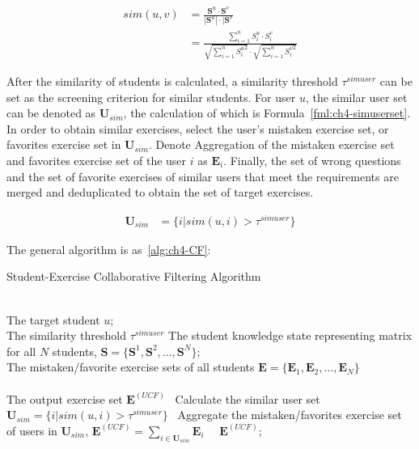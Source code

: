 \begin{equation}
  \begin{align}\label{fml:ch4-user_similarity}
    sim(u, v) & =\frac{\mathbf{S}^u \cdot \mathbf{S}^v}{|\mathbf{S}^u|\cdot |\mathbf{S}^v}                                                                 \\
              & =\frac{\sum\limits_{i = 1}^{n}{S^u_i\cdot S^v_i}}{\sqrt{\sum\limits_{i = 1}^{n}{{S^u_i}^2}}\cdot\sqrt{\sum\limits_{i = 1}^{n}{{S^v_i}^2}}}
  \end{align}
\end{equation}

After the similarity of students is calculated, a similarity threshold \(\tau^{simuser}\) can be set as the screening criterion for similar students. For user \(u\), the similar user set can be denoted as \(\mathbf{U}_{sim}\), the calculation of which is Formula~\ref{fml:ch4-simuserset}. In order to obtain similar exercises, select the user's mistaken exercise set, or favorites exercise set in \(\mathbf{U}_{sim}\). Denote Aggregation of the mistaken exercise set and favorites exercise set of the user \(i\) as \(\mathbf{E}_{i}\). Finally, the set of wrong questions and the set of favorite exercises of similar users that meet the requirements are merged and deduplicated to obtain the set of target exercises.

\begin{align}
  \mathbf{U}_{sim} & =\{i|sim(u,i)>\tau^{simuser}\}  \label{fml:ch4-simuserset}
\end{align}

The general algorithm is as~\ref{alg:ch4-CF}:
\begin{algorithm}[h]
  \caption{Student-Exercise Collaborative Filtering Algorithm}\label{alg:ch4-CF}
  \begin{algorithmic}
    \REQUIRE~~\\
    The target student \(u\); \\
    The similarity threshold \(\tau^{simuser}\)
    The student knowledge state representing matrix for all \(N\) students, \(\mathbf{S}=\{\mathbf{S}^1,\mathbf{S}^2,\ldots,\mathbf{S}^N\} \);\\
    The mistaken/favorite exercise sets of all students \( \mathbf{E}=\{\mathbf{E}_1,\mathbf{E}_2,\ldots,\mathbf{E}_N\} \) \\
    \ENSURE~~\\ %
    The output exercise set \(\mathbf{E}^{(UCF)} \)
    \STATE~Calculate the similar user set \(\mathbf{U}_{sim}=\{i|sim(u,i)>\tau^{simuser}\}  \)
    \STATE~Aggregate the mistaken/favorites exercise set of users in \(\mathbf{U}_{sim}\), \(\mathbf{E}^{(UCF)}=\sum\limits_{i \in \mathbf{U}_{sim}}{\mathbf{E}_{i}}\)
    \RETURN~~\(\mathbf{E}^{(UCF)} \); %
  \end{algorithmic}
\end{algorithm}


